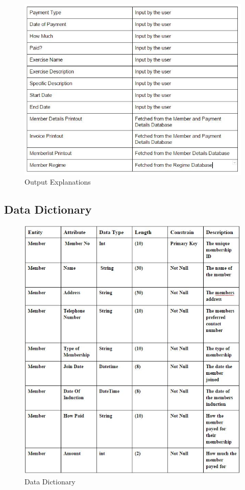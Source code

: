 \begin{itemize}
\begin{figure}[H]
    \includegraphics[width=\textwidth]{Outputexplanations2.JPG}
    \caption{Output Explanations} \label{fig:Output Explanations}
\end{figure}

\subsection{Data Dictionary}

\begin{figure}[H]
    \includegraphics[width=\textwidth]{datadict1.JPG}
    \caption{Data Dictionary} \label{fig: Data Destinations and Sources }
\end{figure}


\end{itemize}
